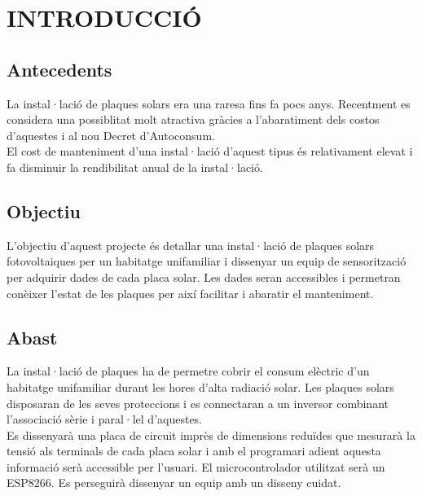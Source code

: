 \chapter{\uppercase{Introducció}}

\section{Antecedents}
La instal·lació de plaques solars era una raresa fins fa pocs anys. Recentment es considera una possiblitat molt atractiva gràcies a l'abaratiment dels costos d'aquestes i al nou Decret d'Autoconsum.\\
\newline El cost de manteniment d'una instal·lació d'aquest tipus és relativament elevat i fa disminuir la rendibilitat anual de la instal·lació.

\section{Objectiu}
L'objectiu d'aquest projecte és detallar una instal·lació de plaques solars fotovoltaiques per un habitatge unifamiliar i dissenyar un equip de sensorització per adquirir dades de cada placa solar. Les dades seran accessibles i permetran conèixer l'estat de les plaques per així facilitar i abaratir el manteniment.

\section{Abast}
La instal·lació de plaques ha de permetre cobrir el consum elèctric d'un habitatge unifamiliar durant les hores d'alta radiació solar. Les plaques solars disposaran de les seves proteccions i es connectaran a un inversor combinant l'associació sèrie i paral·lel d'aquestes.\\
\newline Es dissenyarà una placa de circuit imprès de dimensions reduïdes que mesurarà la tensió als terminals de cada placa solar i amb el programari adient aquesta informació serà accessible per l'usuari. El microcontrolador utilitzat serà un ESP8266. Es perseguirà dissenyar un equip amb un disseny cuidat.



\clearpage



